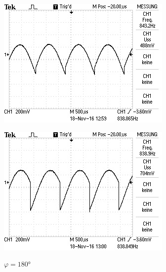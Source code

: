 \begin{figure}[!h]
\begin{minipage}[t]{0.3\textwidth}
\includegraphics[width=\textwidth]{Bilder/Rausch270.jpg}
\label{fig:11}
\caption*{$\varphi = 180\si{\degree}$}
\end{minipage}
\hspace{12pt}
\vspace{5pt}
\begin{minipage}[t]{0.3\textwidth}
\includegraphics[width=\textwidth]{Bilder/Rausch315.jpg}
\label{fig:12}
\caption*{$\varphi = 180\si{\degree}$}
\end{minipage}
\hspace{12pt}
\vspace{5pt}
\end{figure}

